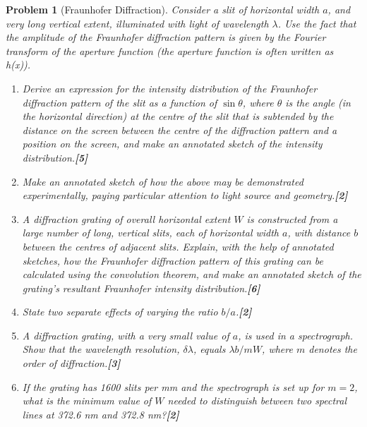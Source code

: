 \documentclass[a4paper]{article}
\theoremstyle{new}
\newtheorem{qns}{Problem}[subsection]
\begin{document}
\begin{qns}[Fraunhofer Diffraction]
Consider a slit of horizontal width $a$, and very long vertical extent, illuminated with light of wavelength $\lambda$. Use the fact that the amplitude of the Fraunhofer diffraction pattern is given by the Fourier transform of the aperture function (the aperture function is often written as h(x)).
\begin{enumerate}[label=(\roman*)]
\item Derive an expression for the intensity distribution of the Fraunhofer diffraction pattern of the slit as a function of $\sin\theta$, where $\theta$ is the angle (in the horizontal direction) at the centre of the slit that is subtended by the distance on the screen between the centre of the diffraction pattern and a position on the screen, and make an annotated sketch of the intensity distribution.\hfill\textbf{[5]}
\item Make an annotated sketch of how the above may be demonstrated experimentally, paying particular attention to light source and geometry.\hfill\textbf{[2]}
\item A diffraction grating of overall horizontal extent $W$ is constructed from a large number of long, vertical slits, each of horizontal width $a$, with distance $b$ between the centres of adjacent slits. Explain, with the help of annotated sketches, how the Fraunhofer diffraction pattern of this grating can be calculated using the convolution theorem, and make an annotated sketch of the grating’s resultant Fraunhofer intensity distribution.\hfill\textbf{[6]}
\item State two separate effects of varying the ratio $b/a$.\hfill\textbf{[2]}
\item A diffraction grating, with a very small value of $a$, is used in a spectrograph. Show that the wavelength resolution, $\delta\lambda$, equals $\lambda b/mW$, where $m$ denotes the order of diffraction.\hfill\textbf{[3]}
\item If the grating has 1600 slits per mm and the spectrograph is set up for $m = 2$, what is the minimum value of $W$ needed to distinguish between two spectral lines at 372.6 nm and 372.8 nm?\hfill\textbf{[2]}
\end{enumerate}
\end{qns}
\end{document}

